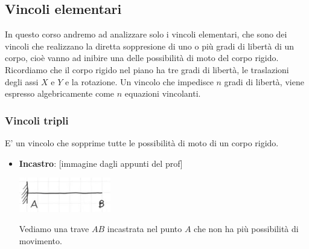 \subsection{Vincoli elementari}
In questo corso andremo ad analizzare solo i vincoli elementari, che sono dei vincoli che realizzano la diretta soppresione di uno o più gradi di libertà di un corpo, cioè vanno ad inibire una delle possibilità di moto del corpo rigido. Ricordiamo che il corpo rigido nel piano ha tre gradi di libertà, le traslazioni degli assi $X$ e $Y$ e la rotazione.\newline
Un vincolo che impedisce $n$ gradi di libertà, viene espresso algebricamente come $n$ equazioni vincolanti.
\subsubsection{Vincoli tripli}
E' un vincolo che sopprime tutte le possibilità di moto di un corpo rigido.
\begin{itemize}
    \item \textbf{Incastro}: [immagine dagli appunti del prof]
    \begin{center}
        \includegraphics[height=1.5cm]{../lezione3/img5.JPG}
    \end{center}
    Vediamo una trave $AB$ incastrata nel punto $A$ che non ha più possibilità di movimento. 
\end{itemize}
